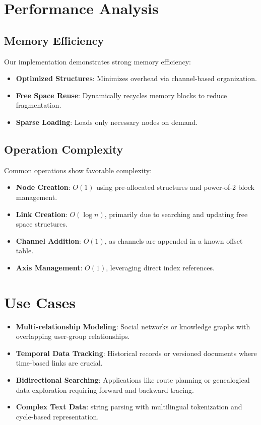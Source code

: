 \documentclass[12pt, a4paper]{article}
\begin{document}
\section{Performance Analysis}\label{Sec:Performance}
\subsection{Memory Efficiency}
Our implementation demonstrates strong memory efficiency:
\begin{itemize}
    \item \textbf{Optimized Structures}: Minimizes overhead via channel-based organization.
    \item \textbf{Free Space Reuse}: Dynamically recycles memory blocks to reduce fragmentation.
    \item \textbf{Sparse Loading}: Loads only necessary nodes on demand.
\end{itemize}

\subsection{Operation Complexity}
Common operations show favorable complexity:
\begin{itemize}
    \item \textbf{Node Creation}: $O(1)$ using pre-allocated structures and power-of-2 block management.
    \item \textbf{Link Creation}: $O(\log n)$, primarily due to searching and updating free space structures.
    \item \textbf{Channel Addition}: $O(1)$, as channels are appended in a known offset table.
    \item \textbf{Axis Management}: $O(1)$, leveraging direct index references.
\end{itemize}

\section{Use Cases}\label{Sec:UseCases}
\begin{itemize}
    \item \textbf{Multi-relationship Modeling}: Social networks or knowledge graphs with overlapping user-group relationships.
    \item \textbf{Temporal Data Tracking}: Historical records or versioned documents where time-based links are crucial.
    \item \textbf{Bidirectional Searching}: Applications like route planning or genealogical data exploration requiring forward and backward tracing.
    \item \textbf{Complex Text Data}: string parsing with multilingual tokenization and cycle-based representation.
\end{itemize}
\end{document}
